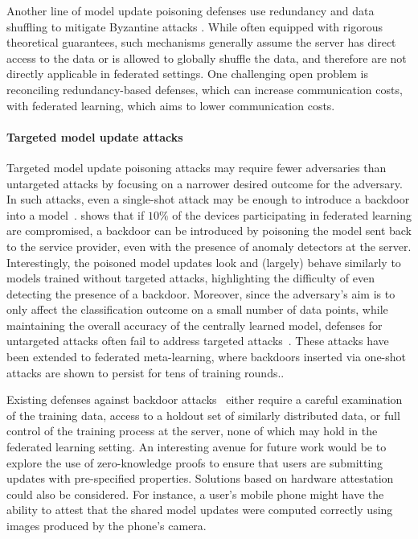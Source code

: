 \documentclass[11pt]{article}
\begin{document}
Another line of model update poisoning defenses use redundancy and data shuffling to mitigate Byzantine attacks \citep{chen18draco, rajput2019detox, data2019data}. While often equipped with rigorous theoretical guarantees, such mechanisms generally assume the server has direct access to the data or is allowed to globally shuffle the data, and therefore are not directly applicable in federated settings. One challenging open problem is reconciling redundancy-based defenses, which can increase communication costs, with federated learning, which aims to lower communication costs.

\paragraph{Targeted model update attacks} Targeted model update poisoning attacks may require fewer adversaries than untargeted attacks by focusing on a narrower desired outcome for the adversary. In such attacks, even a single-shot attack may be enough to introduce a backdoor into a model~\citep{bagdasaryan18backdoor}. \citet{pmlr-v97-bhagoji19a} shows that if $10\%$ of the devices participating in federated learning are compromised, a backdoor can be introduced by poisoning the model sent back to the service provider, even with the presence of anomaly detectors at the server. Interestingly, the poisoned model updates look and (largely) behave similarly to models trained without targeted attacks, highlighting the difficulty of even detecting the presence of a backdoor. Moreover, since the adversary's aim is to only affect the classification outcome on a small number of data points, while maintaining the overall accuracy of the centrally learned model, defenses for untargeted attacks often fail to address targeted attacks~\citep{pmlr-v97-bhagoji19a,bagdasaryan18backdoor}. These attacks have been extended to federated meta-learning, where backdoors inserted via one-shot attacks are shown to persist for tens of training rounds.\cite{chen2020backdoor}.

Existing defenses against backdoor attacks~\citep{steinhardt2017certified, liu2018fine, tran2018spectral, pmlr-v97-diakonikolas19a, wang2019neural, pmlr-v97-shen19e, chou2018sentinet} either require a careful examination of the training data, access to a holdout set of similarly distributed data, or full control of the training process at the server, none of which may hold in the federated learning setting. An interesting avenue for future work would be to explore the use of zero-knowledge proofs to ensure that users are submitting updates with pre-specified properties. Solutions based on hardware attestation could also be considered. For instance, a user's mobile phone might have the ability to attest that the shared model updates were computed correctly using images produced by the phone's camera.
\end{document}
